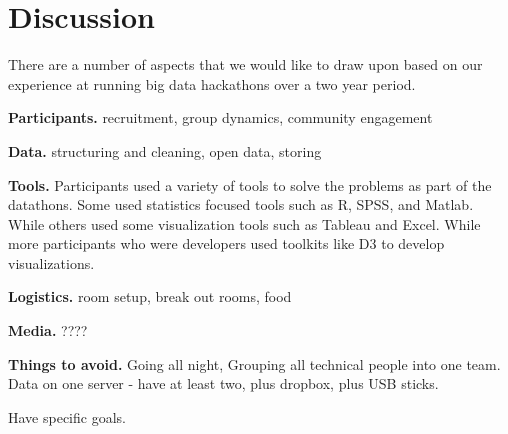 \section{Discussion}

There are a number of aspects that we would like to draw upon based on our experience at running big data hackathons over a two year period.

\textbf{Participants.} recruitment, group dynamics, community engagement

\textbf{Data.} structuring and cleaning, open data, storing

\textbf{Tools.} Participants used a variety of tools to solve the problems as part of the datathons. Some used statistics focused tools such as R, SPSS, and Matlab. While others used some visualization tools such as Tableau and Excel. While more participants who were developers used toolkits like D3 to develop visualizations.

\textbf{Logistics.} room setup, break out rooms, food

\textbf{Media.} ????

\textbf{Things to avoid.} Going all night, Grouping all technical people into one team.  Data on one server - have at least two, plus dropbox, plus USB sticks.

Have specific goals.